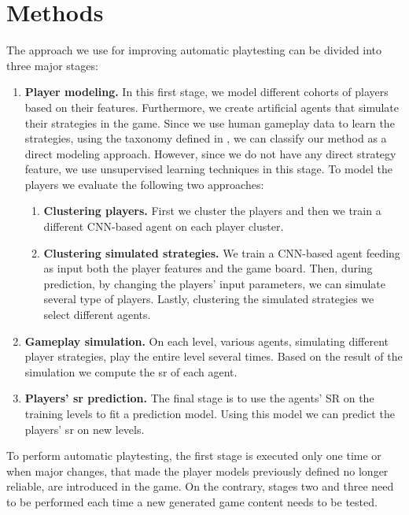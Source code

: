 \chapter{Methods}
\label{chap:method}
 The approach we use for improving automatic playtesting can be divided into three major stages:
 \begin{enumerate}
    \item \textbf{Player modeling.} In this first stage, we model different cohorts of players based on their features. Furthermore, we create artificial agents that simulate their strategies in the game. Since we use human gameplay data to learn the strategies, using the taxonomy defined in \cite{yannakakis_player_2013}, we can classify our method as a direct modeling approach. However, since we do not have any direct strategy feature, we use unsupervised learning techniques in this stage. To model the players we evaluate the following two approaches:
     \begin{enumerate}
        \item \textbf{Clustering players.} First we cluster the players and then we train a different \acs{CNN}-based agent on each player cluster.

        \item \textbf{Clustering simulated strategies.} We train a \acs{CNN}-based agent feeding as input both the player features and the game board. Then, during prediction, by changing the players' input parameters, we can simulate several type of players. Lastly, clustering the simulated strategies we select different agents. 

     \end{enumerate}
    \item \textbf{Gameplay simulation.} On each level, various agents, simulating different player strategies, play the entire level several times. Based on the result of the simulation we compute the \acs{sr} of each agent.
    
    \item \textbf{Players' \acs{sr} prediction.} The final stage is to use the agents' SR on the training levels to fit a prediction model. Using this model we can predict the players' \acs{sr} on new levels.
\end{enumerate}

To perform automatic playtesting, the first stage is executed only one time or when major changes, that made the player models previously defined no longer reliable, are introduced in the game. On the contrary, stages two and three need to be performed each time a new generated game content needs to be tested.

